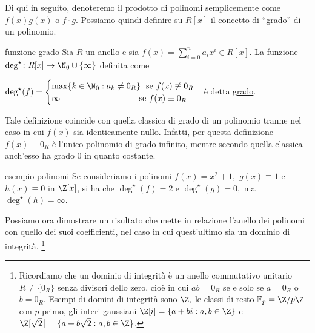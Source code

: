 \vspace{1.5mm}

\noindent Di qui in seguito, denoteremo il prodotto di polinomi semplicemente come $f(x)g(x)$ o $f\cdot g$.
\noindent Possiamo quindi definire su $R[x]$ il concetto di ``grado'' di un polinomio.


\begin{defn}{funzione grado}
Sia $R$ un anello e sia $f(x)=\sum\limits_{i=0}^n a_i x^i\in R[x]$. 
La funzione $\deg^{\star}\colon R[x]\to \N_0\cup \{\infty\}$ definita come 

$\deg^{\star}(f)=\begin{cases} \max\{k\in \N_0: a_k\neq 0_R\} 
\text{ \ se }f(x)\not\equiv 0_R \\ \infty 
\text{ \ \ \ \ \ \ \ \ \ \ \ \ \ \ \ \ \ \ \ \ \ \ \ \ \ \ \ se } 
f(x)\equiv 0_R\end{cases}$è detta \underline{grado}.\footnotemark
\end{defn}


\noindent Tale definizione coincide con quella classica di grado di un polinomio tranne nel caso in cui 
$f(x)$ sia identicamente nullo. Infatti, per questa definizione $f(x)\equiv 0_R$ è l'unico polinomio di grado infinito, 
mentre secondo quella classica anch'esso ha grado $0$ in quanto costante. 

\begin{example}[]{esempio polinomi}
Se consideriamo i polinomi $f(x)=x^2+1,$ $g(x)\equiv 1$ e $h(x)\equiv 0$ in $\Z[x]$, 
si ha che $\deg^{\star}(f)=2$ e $\deg^{\star}(g)=0,$ ma $\deg^{\star}(h)=\infty$.
\end{example}

\noindent Possiamo ora dimostrare un risultato che mette in relazione l'anello dei polinomi con quello dei suoi coefficienti, 
nel caso in cui quest'ultimo sia un dominio di integrità.
\footnote{Ricordiamo che un dominio di integrità è un anello commutativo unitario $R\neq \{0_R\}$ senza divisori dello zero, 
cioè in cui $ab=0_R$ se e solo se $a=0_R$ o $b=0_R$. Esempi di domini di integrità sono $\Z,$ 
le classi di resto $\mathbb{F}_p=\Z/p\Z$ con $p$ primo, gli interi gaussiani
$\Z[i]=\left\{a+bi: a,b\in\Z\right\}$ e $\Z[\sqrt{2}\,]=\{a+b\sqrt{2}: a,b\in \Z\}$.}

